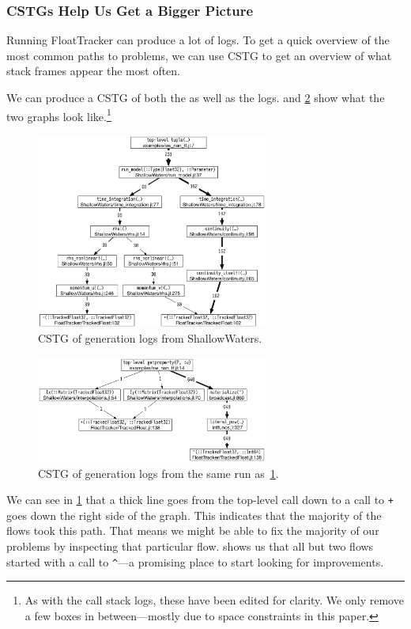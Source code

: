 \documentclass{juliacon}
\begin{document}
\subsubsection{CSTGs Help Us Get a Bigger Picture}

Running FloatTracker can produce a lot of logs.
To get a quick overview of the most common paths to problems, we can use CSTG to get an overview of what stack frames appear the most often.

We can produce a CSTG of both the \Inf{} as well as the \NaN{} logs.
 and \cref{fig:sw_inf_cstg} show what the two graphs look like.\footnote{As with the call stack logs, these have been edited for clarity. We only remove a few boxes in between—mostly due to space constraints in this paper.}


\begin{figure}[t]
  \centering
  \includegraphics[width=3in]{fig/sw_nan_cstg_clean.png}
  \caption{CSTG of \NaN{} generation logs from ShallowWaters.}
  \label{fig:sw_nan_cstg}
\end{figure}

\begin{figure}[t]
  \centering
  \includegraphics[width=3in]{fig/sw_inf_cstg_clean.png}
  \caption{CSTG of \Inf{} generation logs from the same run as~\cref{fig:sw_nan_cstg}.}
  \label{fig:sw_inf_cstg}
\end{figure}

We can see in \cref{fig:sw_nan_cstg} that a thick line goes from the top-level call down to a call to \texttt{+} goes down the right side of the graph.
This indicates that the majority of the flows took this path.
That means we might be able to fix the majority of our problems by inspecting that particular flow.
 shows us that all but two flows started with a call to \texttt{\^}---a promising place to start looking for improvements.
\end{document}
